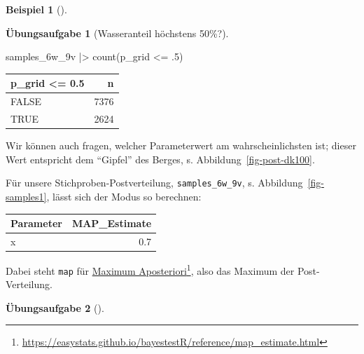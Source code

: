 \documentclass[
  ngerman,
  letterpaper,
  twoside,
  open=any]{scrbook}
\newenvironment{Shaded}{\begin{snugshade}}{\end{snugshade}}
\newcommand{\DecValTok}[1]{\textcolor[rgb]{0.68,0.00,0.00}{#1}}
\newcommand{\FunctionTok}[1]{\textcolor[rgb]{0.28,0.35,0.67}{#1}}
\newcommand{\NormalTok}[1]{\textcolor[rgb]{0.00,0.23,0.31}{#1}}
\newcommand{\SpecialCharTok}[1]{\textcolor[rgb]{0.37,0.37,0.37}{#1}}
\newcounter{none} %
\theoremstyle{definition}
\newtheorem{example}{Beispiel}[chapter]
\theoremstyle{plain}
\theoremstyle{definition}
\newtheorem{exercise}{Übungsaufgabe}[chapter]
\theoremstyle{definition}
\theoremstyle{remark}
\begin{document}
\begin{example}[]
\begin{exercise}[Wasseranteil höchstens
50\%?]
\begin{tcolorbox}[enhanced jigsaw, arc=.35mm, bottomrule=.15mm, breakable, colback=white, colframe=quarto-callout-tip-color-frame, left=2mm, leftrule=.75mm, opacityback=0, rightrule=.15mm, toprule=.15mm]
\begin{Shaded}
\begin{Highlighting}[]
\NormalTok{samples\_6w\_9v }\SpecialCharTok{|\textgreater{}} \FunctionTok{count}\NormalTok{(p\_grid }\SpecialCharTok{\textless{}=}\NormalTok{ .}\DecValTok{5}\NormalTok{)}
\end{Highlighting}
\end{Shaded}

{\def\LTcaptype{none} %
\begin{longtable}[]{@{}lr@{}}
\toprule\noalign{}
p\_grid \textless= 0.5 & n \\
\midrule\noalign{}
\endhead
\bottomrule\noalign{}
\endlastfoot
FALSE & 7376 \\
TRUE & 2624 \\
\end{longtable}
}

\end{tcolorbox}

\end{exercise}

Wir können auch fragen, welcher Parameterwert am wahrscheinlichsten ist;
dieser Wert entspricht dem \enquote{Gipfel} des Berges, s.
Abbildung~\ref{fig-post-dk100}.

Für unsere Stichproben-Postverteilung, \texttt{samples\_6w\_9v}, s.
Abbildung~\ref{fig-samples1}, lässt sich der Modus so berechnen:

\begin{Shaded}
\end{Shaded}

{\def\LTcaptype{none} %
\begin{longtable}[]{@{}lr@{}}
\toprule\noalign{}
Parameter & MAP\_Estimate \\
\midrule\noalign{}
\endhead
\bottomrule\noalign{}
\endlastfoot
x & 0.7 \\
\end{longtable}
}

Dabei steht \texttt{map} für
\href{https://easystats.github.io/bayestestR/reference/map_estimate.html}{Maximum
Aposteriori}\footnote{\url{https://easystats.github.io/bayestestR/reference/map_estimate.html}},
also das Maximum der Post-Verteilung.

\begin{exercise}[]\protect\hypertarget{exr-mw-med-wasser}{}\label{exr-mw-med-wasser}


\end{exercise}
\end{example}
\end{document}
